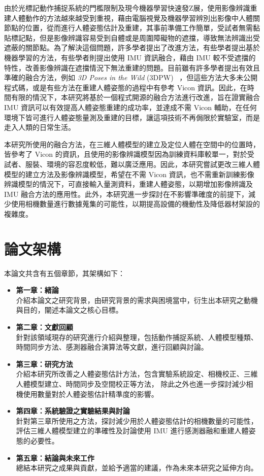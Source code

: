 由於光標記動作捕捉系統的門檻限制及現今機器學習快速發Z展，使用影像辨識重建人體動作的方法越來越受到重視，藉由電腦視覺及機器學習辨別出影像中人體關節點的位置，從而進行人體姿態估計及重建，其事前準備工作簡單，受試者無需黏貼標記點，但是影像辨識容易受到自體或是周圍障礙物的遮擋，導致無法辨識出受遮蔽的關節點。為了解決這個問題，許多學者提出了改進方法，有些學者提出基於機器學習的方法，有些學者則提出使用 IMU 資訊融合，藉由 IMU 較不受遮擋的特性，改善影像辨識在遮擋情況下無法重建的問題。目前雖有許多學者提出有效且準確的融合方法，例如  \textit{3D Poses in the Wild} (3DPW) ~\cite{vonMarcard2018}，但這些方法大多未公開程式碼，或是有些方法在重建人體姿態的過程中有參考 Vicon 資訊。因此，在時間有限的情況下，本研究將基於一個程式開源的融合方法進行改進，旨在證實融合 IMU 資訊可以有效提高人體姿態重建的成功率，並達成不需 Vicon 輔助，在任何環境下皆可進行人體姿態量測及重建的目標，讓這項技術不再侷限於實驗室，而是走入人類的日常生活。

本研究所使用的融合方法，在三維人體模型的建立及定位人體在空間中的位置時，皆參考了 Vicon 的資訊，且使用的影像辨識模型因為訓練資料庫較單一，對於受試者、服裝、環境的容忍度較低，難以廣泛應用。因此，本研究嘗試更改三維人體模型的建立方法及影像辨識模型，希望在不需 Vicon 資訊，也不需重新訓練影像辨識模型的情況下，可直接輸入量測資料，重建人體姿態，以期增加影像辨識及 IMU 融合方法的應用性。此外，本研究進一步探討在不影響準確度的前提下，減少使用相機數量進行數據蒐集的可能性，以期提高設備的機動性及降低器材架設的複雜度。


\section{論文架構}
本論文共含有五個章節，其架構如下：

\begin{itemize}
    \item \textbf{第一章：緒論}
    \\ 介紹本論文之研究背景，由研究背景的需求與困境當中，衍生出本研究之動機與目的，闡述本論文之核心目標。
    \item \textbf{第二章：文獻回顧}
    \\ 針對該領域現存的研究進行介紹與整理，包括動作捕捉系統、人體模型種類、時間同步方法、感測器融合演算法等文獻，進行回顧與討論。
    \item \textbf{第三章：研究方法}
    \\ 介紹本研究所改善之人體姿態估計方法，包含實驗系統設定、相機校正、三維人體模型建立、時間同步及空間校正等方法，
    除此之外也進一步探討減少相機使用數量對於人體姿態估計精準度的影響。
    \item \textbf{第四章：系統驗證之實驗結果與討論}
    \\ 針對第三章所使用之方法，探討減少用於人體姿態估計的相機數量的可能性，評估三維人體模型建立的準確性及討論使用 IMU 進行感測器融和重建人體姿態的必要性。
    \item \textbf{第五章：結論與未來工作}
    \\ 總結本研究之成果與貢獻，並給予適當的建議，作為未來本研究之延伸方向。
\end{itemize}

\clearpage